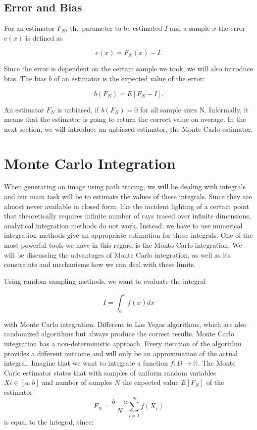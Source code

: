 \subsection{Error and Bias} 

For an estimator $F_N$, the parameter to be estimated $I$ and a sample $x$ the error $e(x)$ is defined as

\begin{equation}
e(x) = F_N(x) - I.
\end{equation}

Since the error is dependent on the certain sample we took, we will also introduce bias. The bias $b$ of an estimator is the expected value of the error:

\begin{equation}
b(F_N) = E[F_N - I].
\end{equation}

An estimator $F_N$ is unbiased, if $b(F_N) = 0$ for all sample sizes N. Informally, it means that the estimator is going to return the correct value on average. In the next section, we will introduce an unbiased estimator, the Monte Carlo estimator.

\section{Monte Carlo Integration}
\label{ch:preliminaries:mci}

When generating an image using path tracing, we will be dealing with integrals and our main task will be to estimate the values of these integrals. Since they are almost never available in closed form, like the incident lighting of a certain point that theoretically requires infinite number of rays traced over infinite dimensions, analytical integration methods do not work. Instead, we have to use numerical integration methods give an appropriate estimation for these integrals. One of the most powerful tools we have in this regard is the Monto Carlo integration. We will be discussing the advantages of Monte Carlo integration, as well as its constraints and mechanisms how we can deal with these limits.

Using random sampling methods, we want to evaluate the integral 

\begin{equation}
I = \int_{a}^{b}f(x)dx
\end{equation}

with Monte Carlo integration. Different to Las Vegas algorithms, which are also randomized algorithms but always produce the correct results, Monte Carlo integration has a non-deterministic approach. Every iteration of the algorithm provides a different outcome and will only be an approximation of the actual integral. Imagine that we want to integrate a function $f:D \rightarrow \mathbb{R}$. The Monte Carlo estimator states that with samples of uniform random variables $Xi \in [a,b]$ and number of samples $N$ the expected value $E[F_N]$ of the estimator 
\begin{equation}
F_N = \frac{b-a}{N}\sum_{i = 1}^{N}f(X_i)
\end{equation}
is equal to the integral, since:

